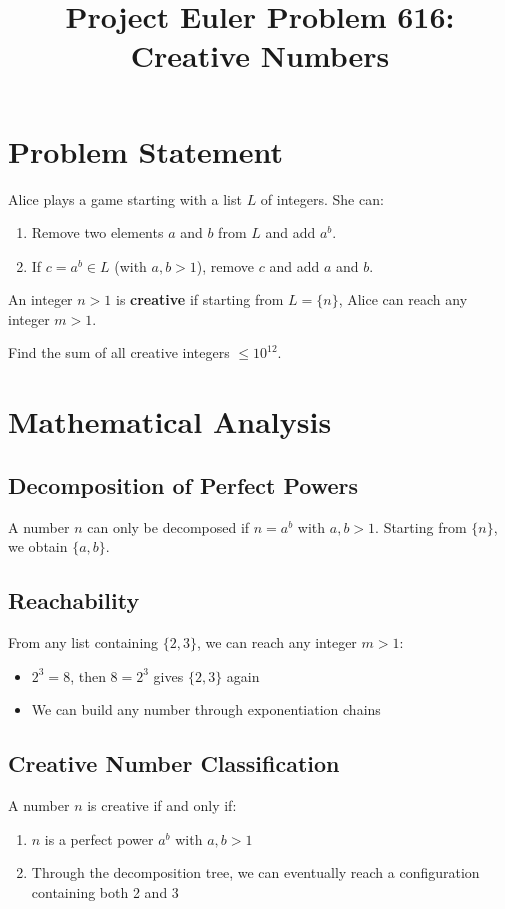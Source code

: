\documentclass[12pt]{article}
\title{Project Euler Problem 616: Creative Numbers}
\author{}
\date{}
\begin{document}
\maketitle

\section{Problem Statement}
Alice plays a game starting with a list $L$ of integers. She can:
\begin{enumerate}
    \item Remove two elements $a$ and $b$ from $L$ and add $a^b$.
    \item If $c = a^b \in L$ (with $a,b > 1$), remove $c$ and add $a$ and $b$.
\end{enumerate}

An integer $n > 1$ is \textbf{creative} if starting from $L = \{n\}$, Alice can reach any integer $m > 1$.

Find the sum of all creative integers $\leq 10^{12}$.

\section{Mathematical Analysis}

\subsection{Decomposition of Perfect Powers}
A number $n$ can only be decomposed if $n = a^b$ with $a, b > 1$. Starting from $\{n\}$, we obtain $\{a, b\}$.

\subsection{Reachability}
From any list containing $\{2, 3\}$, we can reach any integer $m > 1$:
\begin{itemize}
    \item $2^3 = 8$, then $8 = 2^3$ gives $\{2, 3\}$ again
    \item We can build any number through exponentiation chains
\end{itemize}

\subsection{Creative Number Classification}
A number $n$ is creative if and only if:
\begin{enumerate}
    \item $n$ is a perfect power $a^b$ with $a, b > 1$
    \item Through the decomposition tree, we can eventually reach a configuration containing both 2 and 3
\end{enumerate}
\end{document}
